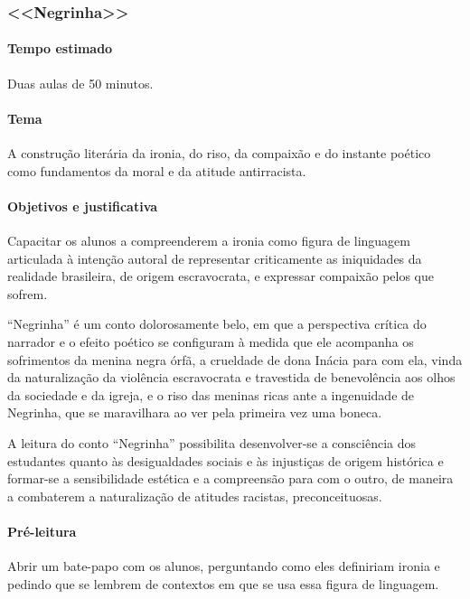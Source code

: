 \documentclass[11pt]{extarticle}
\begin{document}
\subsubsection{<<Negrinha>>}

\paragraph{Tempo estimado} Duas aulas de 50 minutos.

\paragraph{Tema} A construção literária da ironia, do riso, da compaixão e do instante
poético como fundamentos da moral e da atitude antirracista.


\paragraph{Objetivos e justificativa}
Capacitar os alunos a compreenderem a ironia como figura de linguagem
articulada à intenção autoral de representar criticamente as iniquidades
da realidade brasileira, de origem escravocrata, e expressar compaixão
pelos que sofrem.


``Negrinha'' é um conto dolorosamente belo, em que a perspectiva crítica
do narrador e o efeito poético se configuram à medida que ele acompanha
os sofrimentos da menina negra órfã, a crueldade de dona Inácia para com
ela, vinda da naturalização da violência escravocrata e travestida de
benevolência aos olhos da sociedade e da igreja, e o riso das meninas
ricas ante a ingenuidade de Negrinha, que se maravilhara ao ver pela
primeira vez uma boneca.

A leitura do conto ``Negrinha'' possibilita desenvolver-se a consciência
dos estudantes quanto às desigualdades sociais e às injustiças de origem
histórica e formar-se a sensibilidade estética e a compreensão para com
o outro, de maneira a combaterem a naturalização de atitudes racistas,
preconceituosas.



\asterisc{}

\paragraph{Pré-leitura}

Abrir um bate-papo com os alunos, perguntando como eles definiriam
ironia e pedindo que se lembrem de contextos em que se usa essa figura
de linguagem.
\end{document}
